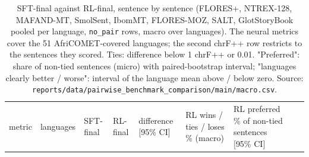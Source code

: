 \begin{table}[t]
\centering
\scriptsize
\setlength{\tabcolsep}{3pt}
\caption{SFT-final against RL-final, sentence by sentence (FLORES+, NTREX-128, MAFAND-MT, SmolSent, IbomMT, FLORES-MOZ, SALT, GlotStoryBook pooled per language, \texttt{no\_pair} rows, macro over languages). The neural metrics cover the 51 AfriCOMET-covered languages; the second chrF++ row restricts to the sentences they scored. Ties: difference below 1 chrF++ or 0.01. "Preferred": share of non-tied sentences (micro) with paired-bootstrap interval; "languages clearly better / worse": interval of the language mean above / below zero. Source: \texttt{reports/data/pairwise\_benchmark\_comparison/main/macro.csv}.}
\label{tab:t_pw_headline}
{\def\LTcaptype{none} %
\begin{tabular}{@{}
  >{\raggedright\arraybackslash}p{}
  >{\raggedleft\arraybackslash}p{}
  >{\raggedleft\arraybackslash}p{}
  >{\raggedleft\arraybackslash}p{}
  >{\raggedleft\arraybackslash}p{}
  >{\raggedleft\arraybackslash}p{}
  >{\raggedleft\arraybackslash}p{}
  >{\raggedleft\arraybackslash}p{}
  >{\raggedleft\arraybackslash}p{}@{}}
\toprule
\begin{minipage}[b]{\linewidth}\raggedright
metric
\end{minipage} & \begin{minipage}[b]{\linewidth}\raggedleft
languages
\end{minipage} & \begin{minipage}[b]{\linewidth}\raggedleft
SFT-final
\end{minipage} & \begin{minipage}[b]{\linewidth}\raggedleft
RL-final
\end{minipage} & \begin{minipage}[b]{\linewidth}\raggedleft
difference {[}95\% CI{]}
\end{minipage} & \begin{minipage}[b]{\linewidth}\raggedleft
RL wins / ties / loses \% (macro)
\end{minipage} & \begin{minipage}[b]{\linewidth}\raggedleft
RL preferred \% of non-tied sentences {[}95\% CI{]}

\end{minipage}
\end{tabular}}
\end{table}
